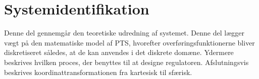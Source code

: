 \part{Systemidentifikation}
Denne del gennemgår den teoretiske udredning af systemet. 
Denne del lægger vægt på den matematiske model af PTS, hvorefter overføringsfunktionerne bliver diskretiseret således, at de kan anvendes i det diskrete domæne. 
Ydermere beskrives hvilken proces, der benyttes til at designe regulatoren.
Afslutningsvis beskrives koordinattransformationen fra kartesisk til sfærisk.




